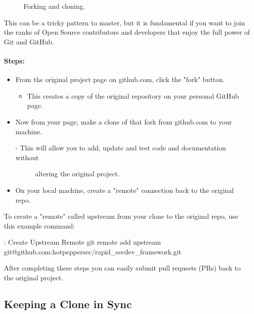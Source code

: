 \begin{figure}[!htb]
  
  \caption{Forking and cloning.}
\end{figure}

This can be a tricky pattern to master, but it is fundamental if you
want to join the ranks of Open Source contributors and developers that
enjoy the full power of Git and GitHub.


\paragraph{Steps:}

\begin{itemize}

  \item
        From the original project page on github.com, click the "fork" button.

        \begin{itemize}

          \item
                This creates a copy of the original repository on your personal
                GitHub page.
        \end{itemize}
  \item
        Now from your page, make a clone of that fork from github.com to your
        machine.

        \begin{description}
          \item[- This will allow you to add, update and test code and
                documentation without]
                altering the original project.
        \end{description}
  \item
        On your local machine, create a "remote" connection back to the
        original repo.
\end{itemize}

To create a "remote" called upstream from your clone to the original
repo, use this example command:

\begin{mybox}{\thetcbcounter: Create Upstream Remote}
  git remote add upstream git@github.com:hotpeppersec/rapid\_secdev\_framework.git
\end{mybox}

After completing these steps you can easily submit pull requests (PRs)
back to the original project.

\hypertarget{keeping-a-clone-in-sync}{%
  \subsection{Keeping a Clone in Sync}\label{keeping-a-clone-in-sync}}

